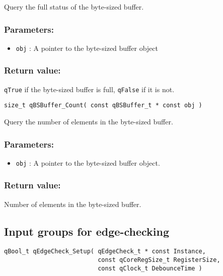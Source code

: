 Query the full status of the byte-sized buffer. 

\subsubsection*{Parameters:}
\begin{itemize}
    \item \lstinline{obj} : A pointer to the byte-sized buffer object
\end{itemize}

\subsubsection*{Return value:}
\lstinline{qTrue} if the byte-sized buffer is full, \lstinline{qFalse} if it is not.


\noindent\hrulefill

\begin{lstlisting}[style=CStyle]
size_t qBSBuffer_Count( const qBSBuffer_t * const obj )
\end{lstlisting}

Query the number of elements in the byte-sized buffer. 

\subsubsection*{Parameters:}
\begin{itemize}
    \item \lstinline{obj} : A pointer to the byte-sized buffer object.
\end{itemize}

\subsubsection*{Return value:}
Number of elements in the byte-sized buffer.



\subsection{Input groups for edge-checking}

\begin{lstlisting}[style=CStyle]
qBool_t qEdgeCheck_Setup( qEdgeCheck_t * const Instance, 
                          const qCoreRegSize_t RegisterSize,
                          const qClock_t DebounceTime )
\end{lstlisting}

